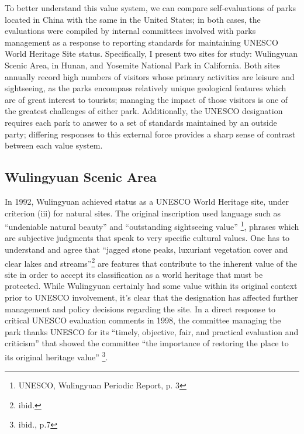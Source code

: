To better understand this value system, we can compare self-evaluations of
parks located in China with the same in the United States; in both cases, the
evaluations were compiled by internal committees involved with parks
management as a response to reporting standards for maintaining UNESCO World
Heritage Site status. Specifically, I present two sites for study: Wulingyuan Scenic Area,
in Hunan, and Yosemite National Park in California. Both sites annually
record high numbers of visitors whose primary activities are leisure and
sightseeing, as the parks encompass relatively unique geological features which
are of great interest to tourists; managing the impact of those visitors is one
of the greatest challenges of either park. Additionally, the UNESCO designation
requires each park to answer to a set of standards maintained by an outside
party; differing responses to this external force provides a sharp sense of
contrast between each value system.

\subsection*{Wulingyuan Scenic Area}

In 1992, Wulingyuan achieved status as a UNESCO World Heritage site, under
criterion (iii) for natural sites. The original inscription used language
such as ``undeniable natural beauty'' and ``outstanding sightseeing value''
\footnote{UNESCO, Wulingyuan Periodic Report, p. 3}, phrases which are
subjective judgments that speak to very specific cultural values. One has
to understand and agree that ``jagged stone peaks, luxuriant vegetation cover and clear
lakes and streams''\footnote{ibid.} are features that contribute to the
inherent value of the site in order to accept its classification as a
world heritage that must be protected. While Wulingyuan certainly had some
value within its original context prior to UNESCO involvement, it's
clear that the designation has affected further management and policy
decisions regarding the site. In a direct response to critical UNESCO evaluation
comments in 1998, the committee managing the park thanks UNESCO for its
``timely, objective, fair, and practical evaluation and criticism'' that
showed the committee ``the importance of restoring the place to its original
heritage value'' \footnote{ibid., p.7}.

